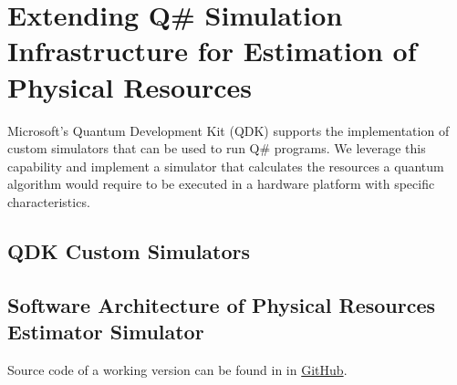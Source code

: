 %
%
\chapter {Extending Q\# Simulation Infrastructure for Estimation of Physical Resources}

Microsoft's Quantum Development Kit (QDK) supports the implementation of custom simulators that can be used to run Q\# programs. We leverage this capability and implement a simulator that calculates the resources a quantum algorithm would require to be executed in a hardware platform with specific characteristics.

\section{QDK Custom Simulators}


\section{Software Architecture of Physical Resources Estimator Simulator}


Source code of a working version can be found in in \href{https://github.com/cesarzc/qc-resources-estimation}{GitHub}.
